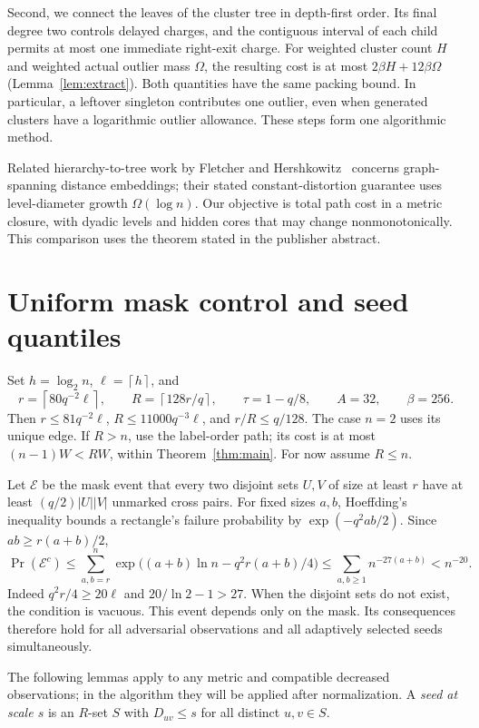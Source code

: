 \documentclass[acmsmall,11pt,nonacm]{acmart}
\theoremstyle{definition}
\newcommand{\calE}{\mathcal E}
\newcommand{\ceil}[1]{\left\lceil #1\right\rceil}
\begin{document}
Second, we connect the leaves of the cluster tree in depth-first order.
Its final degree two controls delayed charges, and the contiguous interval
of each child permits at most one immediate right-exit charge. For weighted
cluster count $H$ and weighted actual outlier mass $\Omega$, the resulting
cost is at most $2\beta H+12\beta\Omega$ (Lemma~\ref{lem:extract}).
Both quantities have the same packing bound. In particular, a leftover
singleton contributes one outlier, even when generated clusters have a
logarithmic outlier allowance. These steps form one algorithmic method.

Related hierarchy-to-tree work by Fletcher and Hershkowitz~\cite{fletcher2026}
concerns graph-spanning distance embeddings; their stated constant-distortion
guarantee uses level-diameter growth $\Omega(\log n)$. Our objective is total
path cost in a metric closure, with dyadic levels and hidden cores that may
change nonmonotonically. This comparison uses the theorem stated in the
publisher abstract.

\section{Uniform mask control and seed quantiles}\label{sec:seeds}

Set $h=\log_2 n$, $\ell=\ceil{h}$, and
\[
 r=\ceil{80q^{-2}\ell},\qquad R=\ceil{128r/q},\qquad
 \tau=1-q/8,\qquad A=32,\qquad\beta=256.
\]
Then $r\leq81q^{-2}\ell$, $R\leq11000q^{-3}\ell$, and $r/R\leq q/128$.
The case $n=2$ uses its unique edge. If $R>n$, use the label-order path;
its cost is at most $(n-1)W<RW$, within Theorem~\ref{thm:main}.
For now assume $R\leq n$.

Let $\calE$ be the mask event that every two disjoint sets $U,V$ of size
at least $r$ have at least $(q/2)|U||V|$ unmarked cross pairs.
For fixed sizes $a,b$, Hoeffding's inequality bounds a rectangle's failure
probability by $\exp(-q^2ab/2)$. Since $ab\geq r(a+b)/2$,
\begin{equation}\label{eq:mask}
 \Pr(\calE^c)\leq
 \sum_{a,b=r}^n\exp\big((a+b)\ln n-q^2r(a+b)/4\big)
 \leq\sum_{a,b\geq1}n^{-27(a+b)}<n^{-20}.
\end{equation}
Indeed $q^2r/4\geq20\ell$ and $20/\ln2-1>27$.
When the disjoint sets do not exist, the condition is vacuous.
This event depends only on the mask. Its consequences therefore hold for
all adversarial observations and all adaptively selected seeds simultaneously.

The following lemmas apply to any metric and compatible decreased observations;
in the algorithm they will be applied after normalization.
A \emph{seed at scale $s$} is an $R$-set $S$ with $D_{uv}\leq s$
for all distinct $u,v\in S$.
\end{document}
